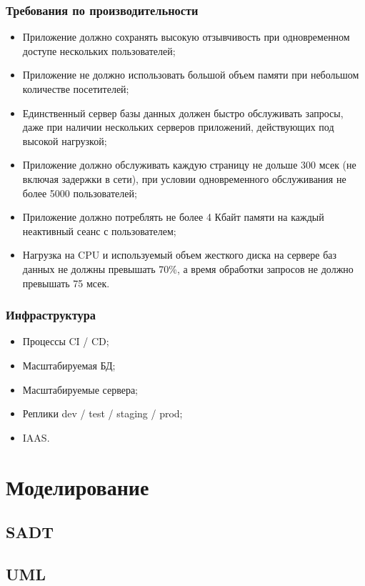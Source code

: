 \documentclass[a4paper,8pt]{article}
\begin{document}
\subsubsection{Требования по производительности}

    \begin{itemize}
        \item Приложение должно сохранять высокую отзывчивость при одновременном доступе нескольких пользователей;
        \item Приложение не должно использовать большой объем памяти при небольшом количестве посетителей;
        \item Единственный сервер базы данных должен быстро обслуживать запросы, даже при наличии нескольких серверов приложений, действующих под высокой нагрузкой;
        \item Приложение должно обслуживать каждую страницу не дольше 300 мсек (не включая задержки в сети), при условии одновременного обслуживания не более 5000 пользователей;
        \item Приложение должно потреблять не более 4 Кбайт памяти на каждый неактивный сеанс с пользователем;
        \item Нагрузка на CPU и используемый объем жесткого диска на сервере баз данных не должны превышать 70\%, а время обработки запросов не должно превышать 75 мсек.

    \end{itemize}


\subsubsection{Инфраструктура}

    \begin{itemize}
        \item Процессы CI / CD;
        \item Масштабируемая БД;
        \item Масштабируемые сервера;
        \item Реплики dev / test / staging / prod;
        \item IAAS.
    \end{itemize}


\section{Моделирование}


\subsection{SADT}
\subsection{UML}
\end{document}
